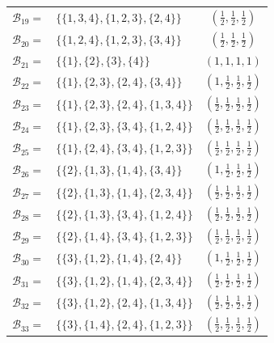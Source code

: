 \documentclass[10pt,a4paper,titlepage]{article}
\theoremstyle{plain}
\theoremstyle{definition}
\begin{document}
\begin{tabular}{ | r l | c | }
    $\mathcal{B}_{19} =$ & $\{\{1,3,4\}, \{1,2,3\}, \{2,4\}\}$ & $\left(\frac{1}{2}, \frac{1}{2}, \frac{1}{2}\right)$\\[2pt]
    $\mathcal{B}_{20} =$ & $\{\{1,2,4\}, \{1,2,3\}, \{3,4\}\}$ & $\left(\frac{1}{2}, \frac{1}{2}, \frac{1}{2}\right)$\\[2pt]
    $\mathcal{B}_{21} =$ & $\{\{1\}, \{2\}, \{3\}, \{4\}\}$ & $\left(1, 1, 1, 1\right)$\\[2pt]
    $\mathcal{B}_{22} =$ & $\{\{1\}, \{2,3\}, \{2,4\}, \{3,4\}\}$ & $\left(1, \frac{1}{2}, \frac{1}{2}, \frac{1}{2}\right)$\\[2pt]
    $\mathcal{B}_{23} =$ & $\{\{1\}, \{2,3\}, \{2,4\}, \{1,3,4\}\}$ & $\left(\frac{1}{2}, \frac{1}{2}, \frac{1}{2}, \frac{1}{2}\right)$\\[2pt]
    $\mathcal{B}_{24} =$ & $\{\{1\}, \{2,3\}, \{3,4\}, \{1,2,4\}\}$ & $\left(\frac{1}{2}, \frac{1}{2}, \frac{1}{2}, \frac{1}{2}\right)$\\[2pt]
    $\mathcal{B}_{25} =$ & $\{\{1\}, \{2,4\}, \{3,4\}, \{1,2,3\}\}$ & $\left(\frac{1}{2}, \frac{1}{2}, \frac{1}{2}, \frac{1}{2}\right)$\\[2pt]
    $\mathcal{B}_{26} =$ & $\{\{2\}, \{1,3\}, \{1,4\}, \{3,4\}\}$ & $\left(1, \frac{1}{2}, \frac{1}{2}, \frac{1}{2}\right)$\\[2pt]
    $\mathcal{B}_{27} =$ & $\{\{2\}, \{1,3\}, \{1,4\}, \{2,3,4\}\}$ & $\left(\frac{1}{2}, \frac{1}{2}, \frac{1}{2}, \frac{1}{2}\right)$\\[2pt]
    $\mathcal{B}_{28} =$ & $\{\{2\}, \{1,3\}, \{3,4\}, \{1,2,4\}\}$ & $\left(\frac{1}{2}, \frac{1}{2}, \frac{1}{2}, \frac{1}{2}\right)$\\[2pt]
    $\mathcal{B}_{29} =$ & $\{\{2\}, \{1,4\}, \{3,4\}, \{1,2,3\}\}$ & $\left(\frac{1}{2}, \frac{1}{2}, \frac{1}{2}, \frac{1}{2}\right)$\\[2pt]
    $\mathcal{B}_{30} =$ & $\{\{3\}, \{1,2\}, \{1,4\}, \{2,4\}\}$ & $\left(1, \frac{1}{2}, \frac{1}{2}, \frac{1}{2}\right)$\\[2pt]
    $\mathcal{B}_{31} =$ & $\{\{3\}, \{1,2\}, \{1,4\}, \{2,3,4\}\}$ & $\left(\frac{1}{2}, \frac{1}{2}, \frac{1}{2}, \frac{1}{2}\right)$\\[2pt]
    $\mathcal{B}_{32} =$ & $\{\{3\}, \{1,2\}, \{2,4\}, \{1,3,4\}\}$ & $\left(\frac{1}{2}, \frac{1}{2}, \frac{1}{2}, \frac{1}{2}\right)$\\[2pt]
    $\mathcal{B}_{33} =$ & $\{\{3\}, \{1,4\}, \{2,4\}, \{1,2,3\}\}$ & $\left(\frac{1}{2}, \frac{1}{2}, \frac{1}{2}, \frac{1}{2}\right)$\\[2pt]

\end{tabular}
\end{document}
